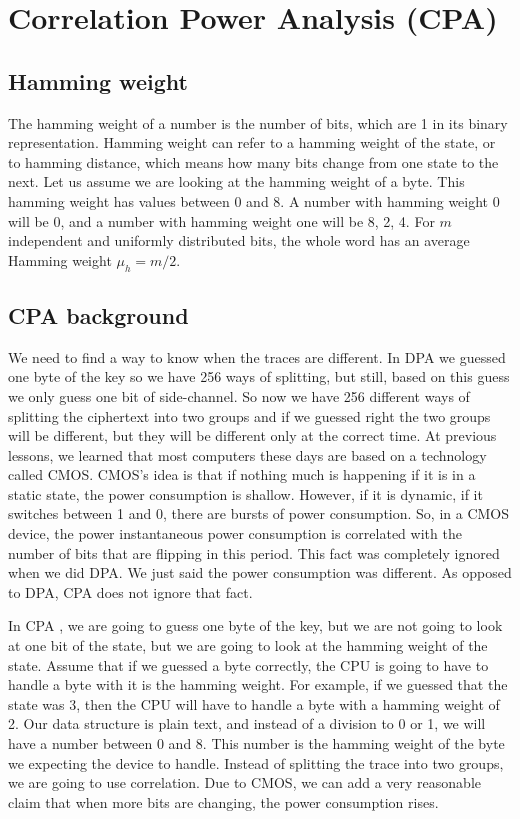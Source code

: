 \section{Correlation Power Analysis (CPA)}\label{c8_cpa:sec}

\subsection{Hamming weight}\label{c8_CPA_hamming_weight:subsec}

The hamming weight \cite{hamming} of a number is the number of bits, which are 1 in its binary
representation. Hamming weight can refer to a hamming weight of the state, or to
hamming distance, which means how many bits change from one state to the
next. Let us assume we are looking at the hamming weight of a byte. This hamming
weight has values between 0 and 8. A number with hamming weight 0 will be 0, and
a number with hamming weight one will be 8, 2, 4. For $m$ independent and uniformly
distributed bits, the whole word has an average Hamming weight $\mu_h = m/2$.

\subsection{CPA background}\label{c8_CPA_background:subsec}

We need to find a way to know when the traces are different. In DPA \cite{kocher1999differential, kocher1998introduction} we guessed
one byte of the key so we have 256 ways of splitting, but still, based on this
guess we only guess one bit of side-channel. So now we have 256 different ways
of splitting the ciphertext into two groups and if we guessed right the two
groups will be different, but they will be different only at the correct time.
At previous lessons, we learned that most computers these days are based on
a technology called CMOS. CMOS's idea is that if nothing much is happening
if it is in a static state,  the power consumption is shallow. However, if it is
dynamic, if it switches between 1 and 0, there are bursts of power consumption.
So, in a CMOS device, the power instantaneous power consumption is correlated
with the number of bits that are flipping in this period. This fact was
completely ignored when we did DPA. We just said the power consumption was
different. As opposed to DPA, CPA does not ignore that fact. 

In CPA \cite{brier2004correlation, coron1962statistics, mayer2000smartly, oswald2003side},
we are going to guess one byte of the key, but we are not going to look
at one bit of the state, but we are going to look at the hamming weight of the
state. Assume that if we guessed a byte correctly, the CPU is going to have to
handle a byte with it is the hamming weight. For example, if we guessed that the
state was 3, then the CPU will have to handle a byte with a hamming weight of 2.
Our data structure is plain text, and instead of a division to 0 or 1, we will
have a number between 0 and 8. This number is the hamming weight of the byte we
expecting the device to handle. Instead of splitting the trace into two groups,
we are going to use correlation. Due to CMOS, we can add a very reasonable claim
that when more bits are changing, the power consumption rises.


